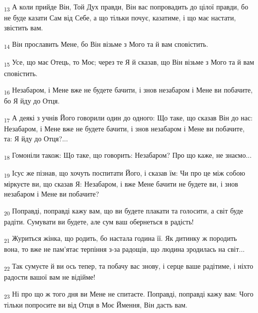 \begin{tcolorbox}
\textsubscript{13} А коли прийде Він, Той Дух правди, Він вас попровадить до цілої правди, бо не буде казати Сам від Себе, а що тільки почує, казатиме, і що має настати, звістить вам.
\end{tcolorbox}
\begin{tcolorbox}
\textsubscript{14} Він прославить Мене, бо Він візьме з Мого та й вам сповістить.
\end{tcolorbox}
\begin{tcolorbox}
\textsubscript{15} Усе, що має Отець, то Моє; через те Я й сказав, що Він візьме з Мого та й вам сповістить.
\end{tcolorbox}
\begin{tcolorbox}
\textsubscript{16} Незабаром, і Мене вже не будете бачити, і знов незабаром і Мене ви побачите, бо Я йду до Отця.
\end{tcolorbox}
\begin{tcolorbox}
\textsubscript{17} А деякі з учнів Його говорили один до одного: Що таке, що сказав Він до нас: Незабаром, і Мене вже не будете бачити, і знов незабаром і Мене ви побачите, та: Я йду до Отця?...
\end{tcolorbox}
\begin{tcolorbox}
\textsubscript{18} Гомоніли також: Що таке, що говорить: Незабаром? Про що каже, не знаємо...
\end{tcolorbox}
\begin{tcolorbox}
\textsubscript{19} Ісус же пізнав, що хочуть поспитати Його, і сказав їм: Чи про це між собою міркуєте ви, що сказав Я: Незабаром, і вже Мене бачити не будете ви, і знов незабаром і Мене ви побачите?
\end{tcolorbox}
\begin{tcolorbox}
\textsubscript{20} Поправді, поправді кажу вам, що ви будете плакати та голосити, а світ буде радіти. Сумувати ви будете, але сум ваш обернеться в радість!
\end{tcolorbox}
\begin{tcolorbox}
\textsubscript{21} Журиться жінка, що родить, бо настала година її. Як дитинку ж породить вона, то вже не пам'ятає терпіння з-за радощів, що людина зродилась на світ...
\end{tcolorbox}
\begin{tcolorbox}
\textsubscript{22} Так сумуєте й ви ось тепер, та побачу вас знову, і серце ваше радітиме, і ніхто радости вашої вам не відійме!
\end{tcolorbox}
\begin{tcolorbox}
\textsubscript{23} Ні про що ж того дня ви Мене не спитаєте. Поправді, поправді кажу вам: Чого тільки попросите ви від Отця в Моє Ймення, Він дасть вам.
\end{tcolorbox}

